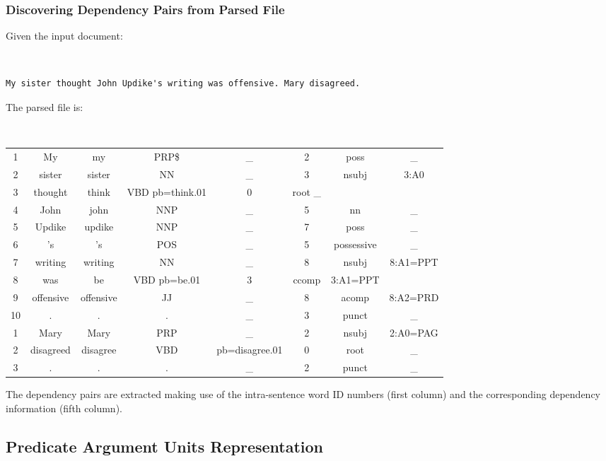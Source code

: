 \documentclass[11pt]{article}
\begin{document}
\subsubsection{Discovering Dependency Pairs from Parsed File} \label{sec:Discover}


Given the input document:

\begin{shaded} \tt
\begin{verbatim}
My sister thought John Updike's writing was offensive. Mary disagreed.
\end{verbatim}
\end{shaded}

The parsed file is:

\begin{shaded} \tt
\footnotesize
\begin{tabular}{cccccccc}
1 &	My &	my &	PRP\$ &	 \_	& 2	 & poss	 &\_ \\
2 &	sister &	sister &	NN &	\_ &	3 &	nsubj &	3:A0 \\
3 &	thought &	think &	VBD	pb=think.01 &	0 &	root	\_ \\
4 &	John &	john	 &NNP &	\_ &	5 &	nn &	 \_ \\
5 &	Updike &	updike &	 NNP &	\_ &	7 &	poss & \_ \\
6 &	's &	's &	POS	 &\_ &	5 &	possessive &	\_ \\
7 &	writing &	writing &	NN &	\_ &	8 &	nsubj &	8:A1=PPT \\
8 &	was &	be &	VBD	pb=be.01 &	3 &	 ccomp &	3:A1=PPT \\
9 &	offensive &	offensive &	JJ & \_	& 8 &	acomp &	8:A2=PRD \\
10 & 	. & 	. &	. &	\_ &	3 &	punct &	\_ \\

1 &	Mary &	Mary &	PRP	 & \_	 & 2	 & nsubj &	2:A0=PAG \\
2 &	disagreed &	disagree &	VBD	 & pb=disagree.01 & 	0 & 	root	 & \_ \\
3 &	. &	. &	. &	\_ &	2 &	punct &	\_ \\
\end{tabular}
\end{shaded}

The dependency pairs are extracted making use of the intra-sentence word ID numbers (first column) and the corresponding dependency information (fifth column).


\subsection{Predicate Argument Units Representation}
\end{document}
